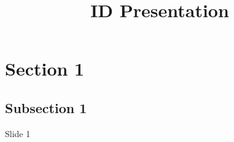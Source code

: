 \documentclass{../common/latex_classes/pdf_presentation}
\title{ID Presentation}
\begin{document}
	\titleToc{}
	\section{Section 1}
	
	\subsection{Subsection 1}
	
	\begin{frame}{Slide 1}
		
	\end{frame}
	
\end{document}
